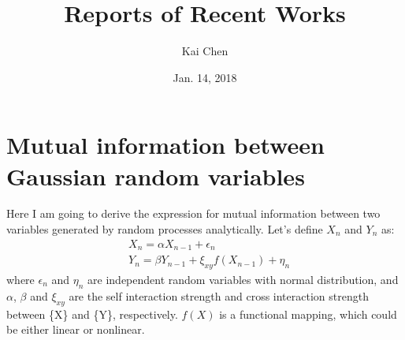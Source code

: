\documentclass{article}
\title{Reports of Recent Works}
\author{Kai Chen}
\date{Jan. 14, 2018}
\begin{document}
	\maketitle
	\section{Mutual information between Gaussian random variables}
	Here I am going to derive the expression for mutual information between two variables generated by random processes analytically. Let's define ${X_n}$ and ${Y_n}$ as:
	\begin{equation}
		\begin{aligned}
			&X_n = \alpha X_{n-1} + \epsilon_n \\
			&Y_n = \beta Y_{n-1} + \xi_{xy}f(X_{n - 1}) + \eta_n
		\end{aligned}
	\end{equation}
	where $\epsilon_n$ and $\eta_n$ are independent random variables with normal distribution, and $\alpha$, $\beta$ and $\xi_{xy}$ are the self interaction strength and cross interaction strength between \{X\} and \{Y\}, respectively. $f(X)$ is a functional mapping, which could be either linear or nonlinear.
\end{document}
